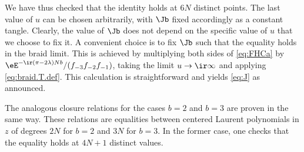 \documentclass[11pt]{article}
\numberwithin{equation}{section}
\theoremstyle{plain}
\numberwithin{equation}{section}
\begin{document}
We have thus checked that the identity holds at $6N$ distinct points. The last value of $u$ can be chosen arbitrarily, with $\Jb$ fixed accordingly as a constant tangle. Clearly, the value of $\Jb$ does not depend on the specific value of $u$ that we choose to fix it. A convenient choice is to fix $\Jb$ such that the equality holds in the braid limit. This is achieved by multiplying both sides of \eqref{eq:FHCa} by $\eE^{-\ir(\pi-2\lambda)Nb}/(f_{-3}f_{-2}f_{-1})$, taking the limit $u \to \ir \infty$ and applying \eqref{eq:braid.T.def}. This calculation is straightforward and yields \eqref{eq:J} as announced.
\eproof

The analogous closure relations for the cases $b=2$ and $b=3$ are proven in the same way. These relations are equalities between centered Laurent polynomials in $z$ of degrees $2N$ for $b=2$ and $3N$ for $b=3$. In the former case, one checks that the equality holds at $4N+1$ distinct values.
\end{document}
